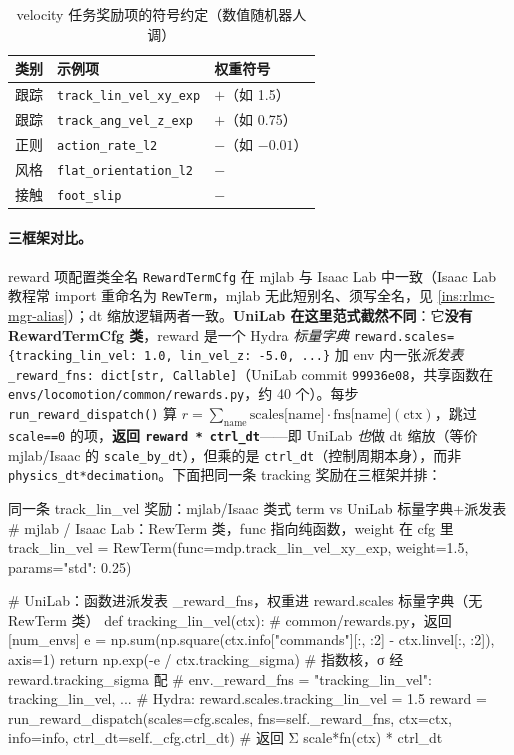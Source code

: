 \begin{table}[H]
\centering
\caption{velocity 任务奖励项的符号约定（数值随机器人调）}
\label{tab:rlmc-mgr-rewexample}
\small
\begin{tabular}{@{}lll@{}}
\toprule
类别 & 示例项 & 权重符号 \\
\midrule
跟踪 & \verb|track_lin_vel_xy_exp| & $+$（如 1.5） \\
跟踪 & \verb|track_ang_vel_z_exp| & $+$（如 0.75） \\
正则 & \verb|action_rate_l2| & $-$（如 $-0.01$） \\
风格 & \verb|flat_orientation_l2| & $-$ \\
接触 & \verb|foot_slip| & $-$ \\
\bottomrule
\end{tabular}
\end{table}

\paragraph{三框架对比。}reward 项配置类全名 \verb|RewardTermCfg| 在 mjlab 与 Isaac Lab 中一致（Isaac Lab 教程常 import 重命名为 \verb|RewTerm|，mjlab 无此短别名、须写全名，见 \cref{ins:rlmc-mgr-alias}）；dt 缩放逻辑两者一致。\textbf{UniLab 在这里范式截然不同}：它\textbf{没有 RewardTermCfg 类}，reward 是一个 Hydra \emph{标量字典} \verb|reward.scales={tracking_lin_vel: 1.0, lin_vel_z: -5.0, ...}| 加 env 内一张\emph{派发表} \verb|_reward_fns: dict[str, Callable]|（UniLab commit \texttt{99936e08}，共享函数在 \texttt{envs/locomotion/common/rewards.py}，约 40 个）。每步 \verb|run_reward_dispatch()| 算 $r=\sum_{\text{name}}\text{scales[name]}\cdot\text{fns[name]}(\text{ctx})$，跳过 \verb|scale==0| 的项，\textbf{返回 \texttt{reward * ctrl\_dt}}——即 UniLab \emph{也}做 dt 缩放（等价 mjlab/Isaac 的 \verb|scale_by_dt|），但乘的是 \verb|ctrl_dt|（控制周期本身），而非 \verb|physics_dt*decimation|。下面把同一条 tracking 奖励在三框架并排：

\begin{codebox}[Python]{同一条 track\_lin\_vel 奖励：mjlab/Isaac 类式 term vs UniLab 标量字典+派发表}
# mjlab / Isaac Lab：RewTerm 类，func 指向纯函数，weight 在 cfg 里
track_lin_vel = RewTerm(func=mdp.track_lin_vel_xy_exp, weight=1.5, params={"std": 0.25})

# UniLab：函数进派发表 _reward_fns，权重进 reward.scales 标量字典（无 RewTerm 类）
def tracking_lin_vel(ctx):                       # common/rewards.py，返回 [num_envs]
    e = np.sum(np.square(ctx.info["commands"][:, :2] - ctx.linvel[:, :2]), axis=1)
    return np.exp(-e / ctx.tracking_sigma)       # 指数核，σ 经 reward.tracking_sigma 配
# env._reward_fns = {"tracking_lin_vel": tracking_lin_vel, ...}
# Hydra: reward.scales.tracking_lin_vel = 1.5
reward = run_reward_dispatch(scales=cfg.scales, fns=self._reward_fns, ctx=ctx,
                             info=info, ctrl_dt=self._cfg.ctrl_dt)  # 返回 Σ scale*fn(ctx) * ctrl_dt
\end{codebox}

